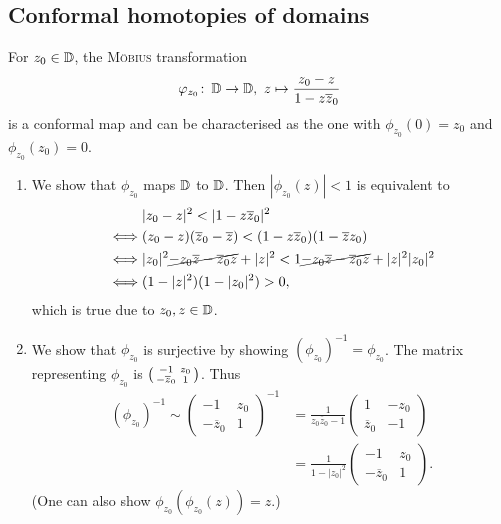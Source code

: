 \documentclass[a4paper,english]{article}
\begin{document}
\subsection{Conformal homotopies of domains}
\begin{lemma}[todo]
    For $z_0 \in \operatorname{\mathbb{D}}$, the \textsc{Möbius} transformation
    \begin{equation*}
        \varphi_{z_0} \colon \operatorname{\mathbb{D}} \to \operatorname{\mathbb{D}}, \
        z \mapsto \frac{z_0 - z}{1 - z \overline{z}_0}
    \end{equation*}
    is a conformal map and can be characterised as the one with $\phi_{z_0}(0) = z_0$ and $\phi_{z_0}(z_0) = 0$.
\end{lemma}

\begin{pr}
    \begin{enumerate}
        \item 
        We show that $\phi_{z_0}$ maps $\operatorname{\mathbb{D}}$ to $\operatorname{\mathbb{D}}$.
        Then $| \phi_{z_0}(z) | < 1$ is equivalent to
        \begin{align*}
            & | z_0 - z |^2 < | 1 - z \overline{z}_0 |^2 \\
            \iff & (z_0 - z) (\overline{z}_0 - \overline{z})
            < (1 - z \overline{z}_0) ( 1 - \overline{z} z_0) \\
            \iff & | z_0 |^2 \cancel{- z_0 \overline{z} - \overline{z}_0 z} + | z |^2
            < 1 \cancel{- z_0 \overline{z} - \overline{z}_0 z} + | z |^2 | z_0 |^2 \\
            \iff & (1 - | z |^2) ( 1 - | z_0 |^2) > 0,
        \end{align*}
        which is true due to $z_0, z \in \operatorname{\mathbb{D}}$.
        
        \item
        We show that $\phi_{z_0}$ is surjective by showing $(\phi_{z_0})^{-1} = \phi_{z_0}$.
        The matrix representing $\phi_{z_0}$ is $\begin{psmallmatrix} -1 & z_0 \\ - \overline{z}_0 & 1 \end{psmallmatrix}$.
        Thus 
        \begin{align*}
            (\phi_{z_0})^{-1}
            \sim \begin{pmatrix} -1 & z_0 \\ - \overline{z}_0 & 1 \end{pmatrix}^{-1}
            & = \frac{1}{z_0 \overline{z}_0 - 1}\begin{pmatrix} 1 & - z_0 \\ \overline{z}_0 & - 1 \end{pmatrix} \\
            & = \frac{1}{1 - | z_0 |^2} \begin{pmatrix} -1 & z_0 \\ - \overline{z}_0 & 1 \end{pmatrix}.
        \end{align*}
        (One can also show $\phi_{z_0}(\phi_{z_0}(z)) = z$.)
        

\end{enumerate}
\end{pr}
\end{document}
